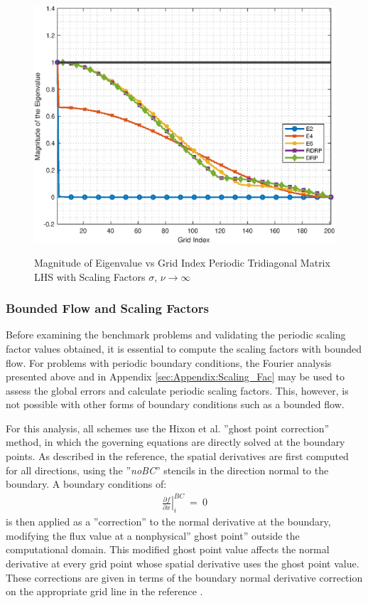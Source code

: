 \documentclass[conf]{new-aiaa}
\begin{document}
\begin{figure}[hbtp!]
	\centering
	{\includegraphics[width=.7\textwidth]{Figures/index_vs_mag_ScaleFactor_Periodic}}
	\caption{Magnitude of Eigenvalue vs Grid Index 
	Periodic Tridiagonal Matrix LHS with Scaling Factors $\sigma$, $\nu\to\infty$}
	\label{fig:index_vs_mag_Scaling}
\end{figure}

\subsubsection{Bounded Flow and Scaling Factors}
Before examining the benchmark problems and validating the periodic scaling factor values obtained, it is essential to compute the scaling factors with bounded flow.
For problems with periodic boundary conditions, the Fourier analysis presented above and in Appendix \ref{sec:Appendix:Scaling_Fac} may be used to assess the global errors and calculate periodic scaling factors. 
This, however, is not possible with other forms of boundary conditions such as a bounded flow. 

For this analysis, all schemes use the Hixon et al. ''ghost point correction'' method, \cite{GPT, RDRP} in which the governing equations are directly solved at the boundary points. 
As described in the reference, the spatial derivatives are first computed for all directions, using the ''\textit{noBC}'' stencils in the direction normal to the boundary. 
A boundary conditions of:
\begin{equation}
	\begin{split}
		\label{eq:}
  			\left.\frac{\partial{f}}{\partial{x}}\right|_i^{BC}~=~0
	\end{split}
\end{equation}
is then applied as a ''correction'' to the normal derivative at the boundary, modifying the flux value at a nonphysical'' ghost point'' outside the computational domain.
This modified ghost point value affects the normal derivative at every grid point whose spatial derivative uses the ghost point value. 
These corrections are given in terms of the boundary normal derivative correction on the appropriate grid line in the reference \cite{GPT, RDRP}. 
\end{document}
